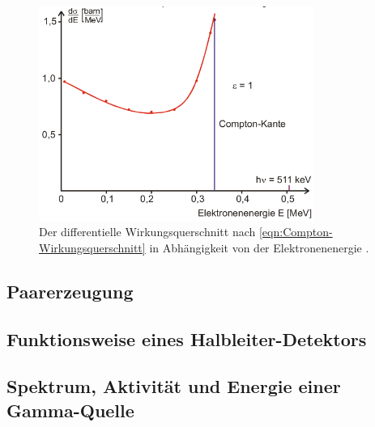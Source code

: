 \begin{figure}
	\centering
	\includegraphics[height=7.0cm]{images/Compton-Wirkungsquerschnitt.pdf}
	\caption{Der differentielle Wirkungsquerschnitt nach \eqref{eqn:Compton-Wirkungsquerschnitt}
	in Abhängigkeit von der Elektronenenergie \cite[7]{anleitung}.}
	\label{fig:Compton-Wirkungsquerschnitt}
\end{figure}

\subsection{Paarerzeugung}
\label{sec:Paarerzeugung}



\subsection{Funktionsweise eines Halbleiter-Detektors}
\label{sec:HLDetektor}

\subsection{Spektrum, Aktivität und Energie einer Gamma-Quelle}
\label{sec:TypischeQuelle}

